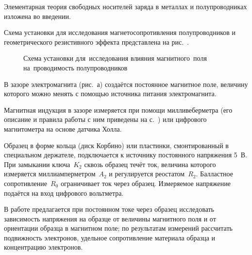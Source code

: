 


Элементарная теория свободных носителей заряда в металлах и полупроводниках
изложена во введении.


\experiment
Схема установки для исследования магнетосопротивления
полупроводников и геометрического резистивного эффекта представлена на
рис.~.
\begin{figure}[h!]
	\caption{Схема установки для~исследования влияния магнитного~поля
на~проводимость полупроводников}
\end{figure}

В зазоре электромагнита (рис.~а) создаётся постоянное магнитное
поле, величину которого можно менять с помощью источника питания электромагнита.

Магнитная индукция в зазоре измеряется при помощи милливеберметра (его описание
и правила работы с ним приведены на с.~\pageref{MWB}) или цифрового магнитометра
на основе датчика Холла.

Образец в форме кольца (диск Корбино) или пластинки, смонтированный в
специальном держателе, подключается к источнику постоянного напряжения 5~В. При
замыкании ключа~$K_2$ сквозь образец течёт ток, величина которого измеряется
миллиамперметром~$A_2$ и регулируется реостатом~$R_2$. Балластное сопротивление~$R_0$
ограничивает ток через образец. Измеряемое напряжение подаётся на вход
цифрового вольтметра.

\labtask


В работе предлагается при постоянном токе через образец исследовать зависимость
напряжения на образце от величины магнитного поля и от ориентации образца в
магнитном поле; по результатам измерений рассчитать подвижность электронов,
удельное сопротивление материала образца и концентрацию электронов.

